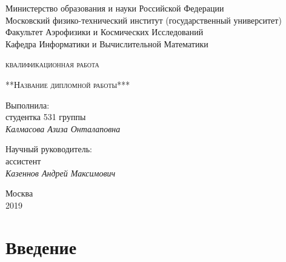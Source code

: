 \documentclass[a4paper,12pt]{article}
\numberwithin{equation}{section}%
\begin{document}
\begin{titlepage}
	\centering
	{Министерство образования и науки Российской Федерации\\
	Московский физико-технический институт (государственный университет)
	\\Факультет Аэрофизики и Космических Исследований
	\\Кафедра Информатики и Вычислительной Математики\par}
	\vspace{4 cm}
	{\scshape{} квалификационная работа \par}
	\vspace{2 cm}
	{\scshape\Large***Название дипломной работы***\par}
	\vfill
	\raggedleft
	{Выполнила:\\
	студентка 531 группы\\
	\itshape Калмасова Азиза Онталаповна\par}
	{Научный руководитель:\\
	ассистент\\
	\itshape Казеннов Андрей Максимович\par}
	\vfill
	\centering
	{\large Москва\\
	2019\par}
\end{titlepage}

\tableofcontents

\newpage
\section{Введение}
\end{document}
